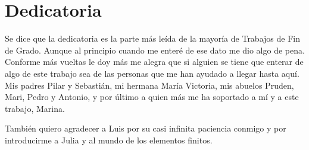 \documentclass[12pt]{report} %
\newcommand{\paginacortesia}{%
	\newpage
	\thispagestyle{empty}
	\mbox{}
}
\begin{document}
\renewcommand\abstractname{\large\bfseries\filcenter\uppercase{Resumen}}
\begin{abstract}
\thispagestyle{plain}
\setcounter{page}{3}

	Este trabajo se centra en la implementación en Julia del elemento hexaédrico curl-conforme de Nédélec de segundo orden para el análisis mediante elementos finitos (FEM) en electromagnetismo computacional. Se emplea una formulación vectorial en el espacio $H(\mathrm{curl})$, para generar de forma sistemática las 54 funciones de base para construir un elemento de referencia y pasarlo al elemento real mediante la transformación de Piola, y se verifica el código frente a una implementación de referencia en MATLAB. Se verifica frente a los resultados del paper, el análisis de los autovalores de una cavidad semillena (inhomogénea) de material dieléctrico, la comparación de rendimiento y de eficiencia en memoria.

	\vspace{0.5cm}
	\textbf{Palabras clave:} Funciones de base curl-conformes; Análisis de elementos finitos; Hexaedros; Julia; N\'ed\'elec

	\vfill
\end{abstract}

\paginacortesia %


\chapter*{Dedicatoria}
\setcounter{page}{5}

	Se dice que la dedicatoria es la parte más leída de la mayoría de Trabajos de Fin de Grado. Aunque al principio cuando me enteré de ese dato me dio algo de pena. Conforme más vueltas le doy más me alegra que si alguien se tiene que enterar de algo de este trabajo sea de las personas que me han ayudado a llegar hasta aquí. Mis padres Pilar y Sebastián, mi hermana María Victoria, mis abuelos Pruden, Mari, Pedro y Antonio, y por último a quien más me ha soportado a mí y a este trabajo, Marina.
	
	También quiero agradecer a Luis por su casi infinita paciencia conmigo y por introducirme a Julia y al mundo de los elementos finitos.
\end{document}
